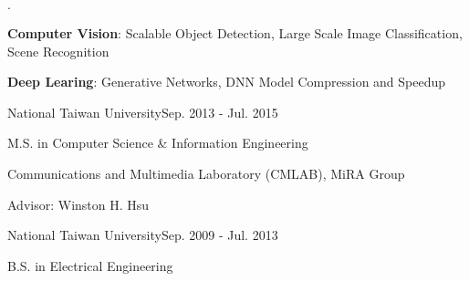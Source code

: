 \documentclass{joel_cv}
\begin{document}
\begin{cvHeader} 
\end{cvHeader}

%
%

\begin{sectionItemize}{$\cdot$}
	\item \textbf{Computer Vision}: 
	Scalable Object Detection, Large Scale Image Classification, Scene Recognition
	\item \textbf{Deep Learing}:
	Generative Networks, DNN Model Compression and Speedup
\end{sectionItemize}

%
%

\begin{sectionContentSimple}{National Taiwan University}{Sep. 2013 - Jul. 2015}
	\item M.S. in Computer Science \& Information Engineering
	\item Communications and Multimedia Laboratory (CMLAB), MiRA Group
	\item Advisor: Winston H. Hsu
\end{sectionContentSimple}

\begin{sectionContentSimple}{National Taiwan University}{Sep. 2009 - Jul. 2013}
	\item B.S. in Electrical Engineering
\end{sectionContentSimple}

%
%
\end{document}
